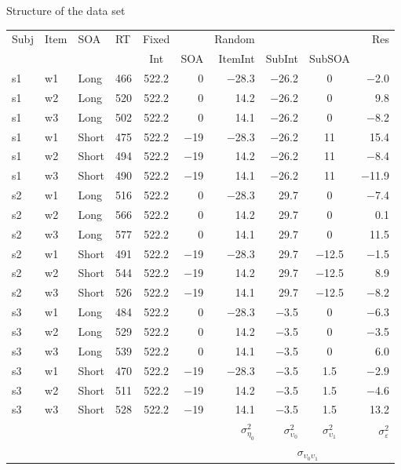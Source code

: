 \documentclass[aspectratio=169]{beamer}
\begin{document}
\begin{frame}{Structure of the data set}
  \vspace{.2cm}
  \scriptsize
  \centering
  \begin{tabular}{llllcrrrcr}
    \hline
    Subj & Item & SOA & RT & Fixed &&  Random &&& Res \\
    \cline{5-6}
    \cline{7-10}
    & & & & Int & SOA & ItemInt & SubInt & SubSOA & \\
    \hline
    s1 & w1 & Long  & 466 & 522.2 & 0     & $-$28.3 & $-$26.2 & 0       & $-$2.0 \\
    s1 & w2 & Long  & 520 & 522.2 & 0     & 14.2    & $-$26.2 & 0       & 9.8 \\
    s1 & w3 & Long  & 502 & 522.2 & 0     & 14.1    & $-$26.2 & 0       & $-$8.2 \\
    s1 & w1 & Short & 475 & 522.2 & $-$19 & $-$28.3 & $-$26.2 & 11      & 15.4 \\
    s1 & w2 & Short & 494 & 522.2 & $-$19 & 14.2    & $-$26.2 & 11      & $-$8.4 \\
    s1 & w3 & Short & 490 & 522.2 & $-$19 & 14.1    & $-$26.2 & 11      & $-$11.9 \\
    s2 & w1 & Long  & 516 & 522.2 & 0     & $-$28.3 & 29.7    & 0       & $-$7.4 \\
    s2 & w2 & Long  & 566 & 522.2 & 0     & 14.2    & 29.7    & 0       & 0.1 \\
    s2 & w3 & Long  & 577 & 522.2 & 0     & 14.1    & 29.7    & 0       & 11.5 \\
    s2 & w1 & Short & 491 & 522.2 & $-$19 & $-$28.3 & 29.7    & $-$12.5 & $-$1.5 \\
    s2 & w2 & Short & 544 & 522.2 & $-$19 & 14.2    & 29.7    & $-$12.5 & 8.9 \\
    s2 & w3 & Short & 526 & 522.2 & $-$19 & 14.1    & 29.7    & $-$12.5 & $-$8.2 \\
    s3 & w1 & Long  & 484 & 522.2 & 0     & $-$28.3 & $-$3.5  & 0       & $-$6.3 \\
    s3 & w2 & Long  & 529 & 522.2 & 0     & 14.2    & $-$3.5  & 0       & $-$3.5 \\
    s3 & w3 & Long  & 539 & 522.2 & 0     & 14.1    & $-$3.5  & 0       & 6.0 \\
    s3 & w1 & Short & 470 & 522.2 & $-$19 & $-$28.3 & $-$3.5  & 1.5     & $-$2.9 \\
    s3 & w2 & Short & 511 & 522.2 & $-$19 & 14.2    & $-$3.5  & 1.5     & $-$4.6 \\
    s3 & w3 & Short & 528 & 522.2 & $-$19 & 14.1    & $-$3.5  & 1.5     & 13.2 \\
    \hline
    &&&&&& $\sigma^2_{\eta_0}$ & $\sigma^2_{\upsilon_0}$ &
    $\sigma^2_{\upsilon_1}$ & $\sigma^2_{\varepsilon}$\\ 
    &&&&&&  & \multicolumn{2}{c}{$\sigma_{\upsilon_0\upsilon_1}$} & 
  \end{tabular}
\end{frame}
\end{document}
